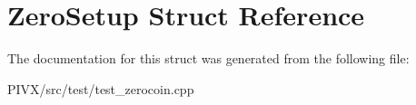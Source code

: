 \hypertarget{struct_zero_setup}{}\section{Zero\+Setup Struct Reference}
\label{struct_zero_setup}


The documentation for this struct was generated from the following file\+:\begin{DoxyCompactItemize}
\item 
P\+I\+V\+X/src/test/test\+\_\+zerocoin.\+cpp\end{DoxyCompactItemize}

